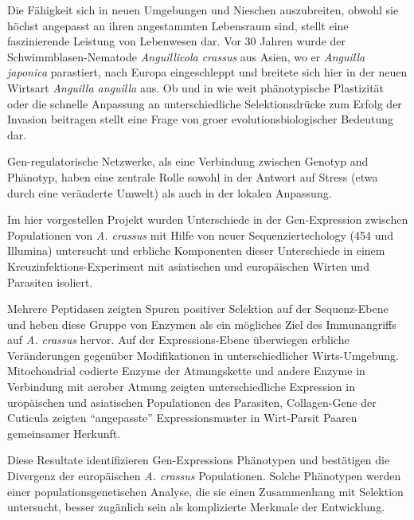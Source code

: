

\begin{zusammenfassung}        %


  Die F\"ahigkeit sich in neuen Umgebungen und Nieschen auszubreiten,
  obwohl sie h\"ochst angepasst an ihren angestammten Lebensraum sind,
  stellt eine faszinierende Leistung von Lebenwesen dar. Vor 30 Jahren
  wurde der Schwimmblasen-Nematode \textit{Anguillicola crassus} aus
  Asien, wo er \textit{Anguilla japonica} parastiert, nach Europa
  eingeschleppt und breitete sich hier in der neuen Wirtsart
  \textit{Anguilla anguilla} aus. Ob und in wie weit ph\"anotypische
  Plastizit\"at oder die schnelle Anpassung an unterschiedliche
  Selektionsdr\"ucke zum Erfolg der Invasion beitragen stellt eine Frage
  von groer evolutionsbiologischer Bedeutung dar.

  Gen-regulatorische Netzwerke, als eine Verbindung zwischen Genotyp
  and Ph\"anotyp, haben eine zentrale Rolle sowohl in der Antwort auf
  Stress (etwa durch eine ver\"anderte Umwelt) als auch in der lokalen
  Anpassung.

  Im hier vorgestellen Projekt wurden Unterschiede in der
  Gen-Expression zwischen Populationen von \textit{A. crassus} mit
  Hilfe von neuer Sequenziertechology (454 und Illumina) untersucht
  und erbliche Komponenten dieser Unterschiede in einem
  Kreuzinfektions-Experiment mit asiatischen und europ\"aischen Wirten
  und Parasiten isoliert.

  Mehrere Peptidasen zeigten Spuren positiver Selektion auf der
  Sequenz-Ebene und heben diese Gruppe von Enzymen als ein m\"ogliches
  Ziel des Immunangriffs auf \textit{A. crassus} hervor. Auf der
  Expressions-Ebene \"uberwiegen erbliche Ver\"anderungen gegen\"uber
  Modifikationen in unterschiedlicher Wirts-Umgebung. Mitochondrial
  codierte Enzyme der Atmungskette und andere Enzyme in Verbindung mit
  aerober Atmung zeigten unterschiedliche Expression in urop\"aischen
  und asiatischen Populationen des Parasiten, Collagen-Gene der
  Cuticula zeigten ``angepasste'' Expressionsmuster in Wirt-Parsit
  Paaren gemeinsamer Herkunft.

  Diese Resultate identifizieren Gen-Expressions Ph\"anotypen und
  best\"atigen die Divergenz der europ\"aischen \textit{A. crassus}
  Populationen. Solche Ph\"anotypen werden einer populationsgenetischen
  Analyse, die sie einen Zusammenhang mit Selektion untersucht, besser
  zug\"anlich sein als komplizierte Merkmale der Entwicklung.

\end{zusammenfassung}





